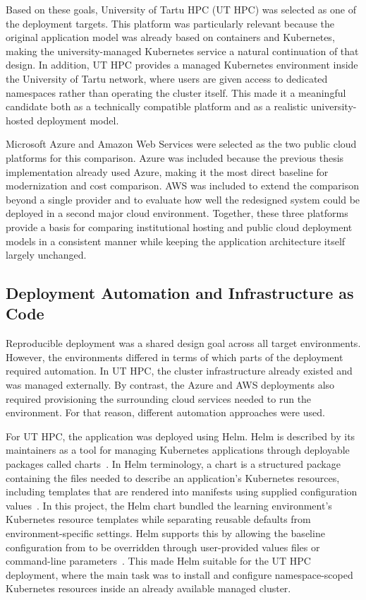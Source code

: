 Based on these goals, University of Tartu HPC (UT HPC) was selected as one of the deployment targets.
This platform was particularly relevant because the original application model was already based on containers and Kubernetes, making the university-managed Kubernetes service a natural continuation of that design.
In addition, UT HPC provides a managed Kubernetes environment inside the University of Tartu network, where users are given access to dedicated namespaces rather than operating the cluster itself.
This made it a meaningful candidate both as a technically compatible platform and as a realistic university-hosted deployment model.

Microsoft Azure and Amazon Web Services were selected as the two public cloud platforms for this comparison.
Azure was included because the previous thesis implementation already used Azure, making it the most direct baseline for modernization and cost comparison.
AWS was included to extend the comparison beyond a single provider and to evaluate how well the redesigned system could be deployed in a second major cloud environment.
Together, these three platforms provide a basis for comparing institutional hosting and public cloud deployment models in a consistent manner while keeping the application architecture itself largely unchanged.

\subsection{Deployment Automation and Infrastructure as Code} \label{subsec:deployment-automation-and-infrastructure-as-code}
Reproducible deployment was a shared design goal across all target environments.
However, the environments differed in terms of which parts of the deployment required automation.
In UT HPC, the cluster infrastructure already existed and was managed externally.
By contrast, the Azure and AWS deployments also required provisioning the surrounding cloud services needed to run the environment.
For that reason, different automation approaches were used.

For UT HPC, the application was deployed using Helm.
Helm is described by its maintainers as a tool for managing Kubernetes applications through deployable packages called charts~\cite{helm_using_helm}.
In Helm terminology, a chart is a structured package containing the files needed to describe an application's Kubernetes resources, including templates that are rendered into manifests using supplied configuration values~\cite{helm_charts}.
In this project, the Helm chart bundled the learning environment's Kubernetes resource templates while separating reusable defaults from environment-specific settings.
Helm supports this by allowing the baseline configuration from  to be overridden through user-provided values files or command-line parameters~\cite{helm_values_files}.
This made Helm suitable for the UT HPC deployment, where the main task was to install and configure namespace-scoped Kubernetes resources inside an already available managed cluster.

